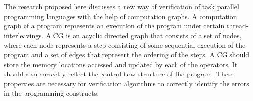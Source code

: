  The research proposed here discusses a new way of verification of task parallel programming languages with the help of computation graphs. A computation graph of a program represents an execution of the program under certain thread-interleavings. A CG is an acyclic directed graph that consists of a set of nodes, where each node represents a step consisting of some sequential execution of the program and a set of edges that represent the ordering of the steps. A CG should store the memory locations accessed and updated by each of the operators. It should also correctly reflect the control flow structure of the program. These properties are necessary for verification algorithms to correctly identify the errors in the programming constructs.
